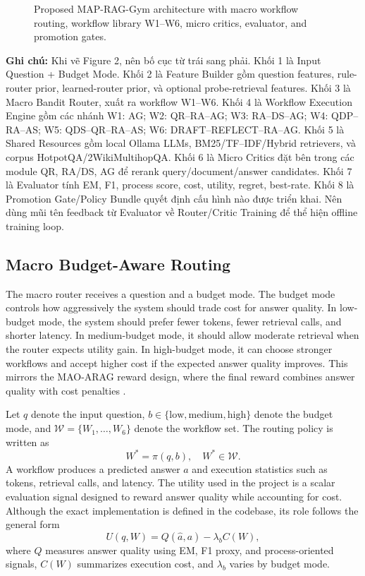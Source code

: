 \documentclass[12pt,a4paper]{article}
\newcommand{\vnote}[1]{{\selectlanguage{vietnamese}\noindent\textcolor{notered}{\textbf{Ghi chú:} #1}\selectlanguage{english}}}
\begin{document}
\begin{figure}[H]
\centering
\caption{Proposed MAP-RAG-Gym architecture with macro workflow routing, workflow library W1--W6, micro critics, evaluator, and promotion gates.}
\label{fig:model_architecture}
\end{figure}
\vnote{Khi vẽ Figure 2, nên bố cục từ trái sang phải. Khối 1 là Input Question + Budget Mode. Khối 2 là Feature Builder gồm question features, rule-router prior, learned-router prior, và optional probe-retrieval features. Khối 3 là Macro Bandit Router, xuất ra workflow W1--W6. Khối 4 là Workflow Execution Engine gồm các nhánh W1: AG; W2: QR--RA--AG; W3: RA--DS--AG; W4: QDP--RA--AS; W5: QDS--QR--RA--AS; W6: DRAFT--REFLECT--RA--AG. Khối 5 là Shared Resources gồm local Ollama LLMs, BM25/TF--IDF/Hybrid retrievers, và corpus HotpotQA/2WikiMultihopQA. Khối 6 là Micro Critics đặt bên trong các module QR, RA/DS, AG để rerank query/document/answer candidates. Khối 7 là Evaluator tính EM, F1, process score, cost, utility, regret, best-rate. Khối 8 là Promotion Gate/Policy Bundle quyết định cấu hình nào được triển khai. Nên dùng mũi tên feedback từ Evaluator về Router/Critic Training để thể hiện offline training loop.}

\subsection{Macro Budget-Aware Routing}

The macro router receives a question and a budget mode. The budget mode controls how aggressively the system should trade cost for answer quality. In low-budget mode, the system should prefer fewer tokens, fewer retrieval calls, and shorter latency. In medium-budget mode, it should allow moderate retrieval when the router expects utility gain. In high-budget mode, it can choose stronger workflows and accept higher cost if the expected answer quality improves. This mirrors the MAO-ARAG reward design, where the final reward combines answer quality with cost penalties \cite{chen2025maoarag}.

Let $q$ denote the input question, $b \in \{\text{low}, \text{medium}, \text{high}\}$ denote the budget mode, and $\mathcal{W}=\{W_1,\ldots,W_6\}$ denote the workflow set. The routing policy is written as
\begin{equation}
    W^{*} = \pi(q,b), \quad W^{*} \in \mathcal{W}.
\end{equation}
A workflow produces a predicted answer $\hat{a}$ and execution statistics such as tokens, retrieval calls, and latency. The utility used in the project is a scalar evaluation signal designed to reward answer quality while accounting for cost. Although the exact implementation is defined in the codebase, its role follows the general form
\begin{equation}
    U(q,W) = Q(\hat{a},a) - \lambda_b C(W),
\end{equation}
where $Q$ measures answer quality using EM, F1 proxy, and process-oriented signals, $C(W)$ summarizes execution cost, and $\lambda_b$ varies by budget mode.
\end{document}
